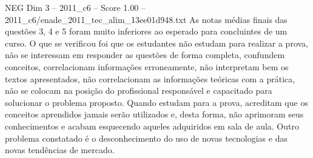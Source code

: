 \begin{textsample}{NEG Dim 3 – 2011\_c6 – Score 1.00 – 2011\_c6/enade\_2011\_tec\_alim\_13ee01d948.txt}
As notas médias finais das questões 3, 4 e 5 foram muito inferiores ao esperado para concluintes de um curso.
O que se verificou foi que os estudantes não estudam para realizar a prova, não se interessam em responder as questões de forma completa, confundem conceitos, correlacionam informações erroneamente, não interpretam bem os textos apresentados, não correlacionam as informações teóricas com a prática, não se colocam na posição do profissional responsável e capacitado para solucionar o problema proposto.
Quando estudam para a prova, acreditam que os conceitos aprendidos jamais serão utilizados e, desta forma, não aprimoram seus conhecimentos e acabam esquecendo aqueles adquiridos em sala de aula.
Outro problema constatado é o desconhecimento do uso de novas tecnologias e das novas tendências de mercado.

\end{textsample}
